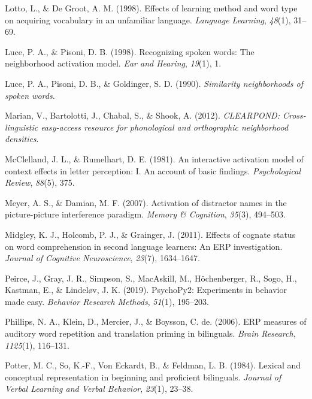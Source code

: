 \documentclass[
]{article}
\newlength{\cslhangindent}
\newenvironment{CSLReferences}[2] %
 {\begin{list}{}{%
  \setlength{\itemindent}{0pt}
  \setlength{\leftmargin}{0pt}
  \setlength{\parsep}{0pt}
  \ifodd #1
   \setlength{\leftmargin}{\cslhangindent}
   \setlength{\itemindent}{-1\cslhangindent}
  \fi
  \setlength{\itemsep}{#2\baselineskip}}}
 {\end{list}}
\begin{document}
\begin{CSLReferences}{1}{0}
Lotto, L., \& De Groot, A. M. (1998). Effects of learning method and
word type on acquiring vocabulary in an unfamiliar language.
\emph{Language Learning}, \emph{48}(1), 31--69.

Luce, P. A., \& Pisoni, D. B. (1998). Recognizing spoken words: The
neighborhood activation model. \emph{Ear and Hearing}, \emph{19}(1), 1.

Luce, P. A., Pisoni, D. B., \& Goldinger, S. D. (1990). \emph{Similarity
neighborhoods of spoken words.}

Marian, V., Bartolotti, J., Chabal, S., \& Shook, A. (2012).
\emph{CLEARPOND: Cross-linguistic easy-access resource for phonological
and orthographic neighborhood densities}.

McClelland, J. L., \& Rumelhart, D. E. (1981). An interactive activation
model of context effects in letter perception: I. An account of basic
findings. \emph{Psychological Review}, \emph{88}(5), 375.

Meyer, A. S., \& Damian, M. F. (2007). Activation of distractor names in
the picture-picture interference paradigm. \emph{Memory \& Cognition},
\emph{35}(3), 494--503.

Midgley, K. J., Holcomb, P. J., \& Grainger, J. (2011). Effects of
cognate status on word comprehension in second language learners: An ERP
investigation. \emph{Journal of Cognitive Neuroscience}, \emph{23}(7),
1634--1647.

Peirce, J., Gray, J. R., Simpson, S., MacAskill, M., Höchenberger, R.,
Sogo, H., Kastman, E., \& Lindeløv, J. K. (2019). PsychoPy2: Experiments
in behavior made easy. \emph{Behavior Research Methods}, \emph{51}(1),
195--203.

Phillips, N. A., Klein, D., Mercier, J., \& Boysson, C. de. (2006). ERP
measures of auditory word repetition and translation priming in
bilinguals. \emph{Brain Research}, \emph{1125}(1), 116--131.

Potter, M. C., So, K.-F., Von Eckardt, B., \& Feldman, L. B. (1984).
Lexical and conceptual representation in beginning and proficient
bilinguals. \emph{Journal of Verbal Learning and Verbal Behavior},
\emph{23}(1), 23--38.


\end{CSLReferences}
\end{document}
